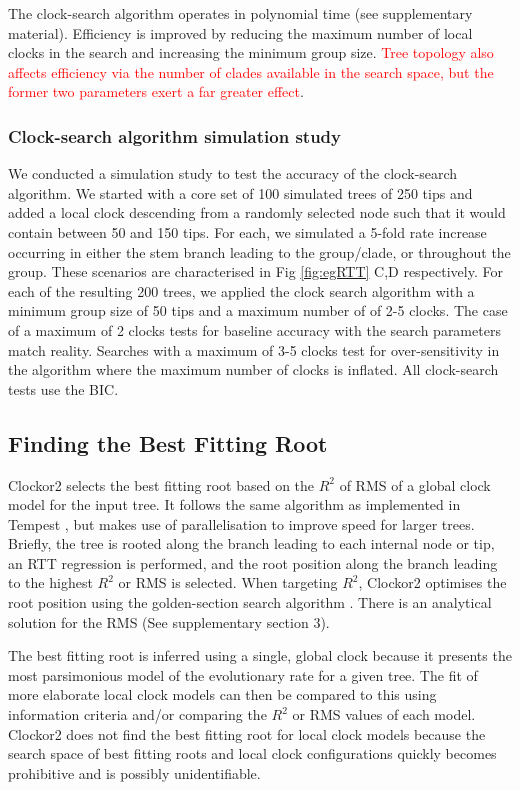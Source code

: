 \documentclass{article}
\begin{document}
The clock-search algorithm operates in polynomial time (see supplementary material). Efficiency is improved by reducing the maximum number of local clocks in the search and increasing the minimum group size. \textcolor{red}{Tree topology also affects efficiency via the number of clades available in the search space, but the former two parameters exert a far greater effect}.

\subsubsection*{Clock-search algorithm simulation study}
We conducted a simulation study to test the accuracy of the clock-search algorithm. We started with a core set of 100 simulated trees of 250 tips and added a local clock descending from a randomly selected node such that it would contain between 50 and 150 tips. For each, we simulated a 5-fold rate increase occurring in either the stem branch leading to the group/clade, or throughout the group. These scenarios are characterised in  Fig \ref{fig:egRTT} C,D respectively. For each of the resulting 200 trees, we applied the clock search algorithm with a minimum group size of 50 tips and a maximum number of of 2-5 clocks. The case of a maximum of 2 clocks tests for baseline accuracy with the search parameters match reality. Searches with a maximum of 3-5 clocks test for over-sensitivity in the algorithm where the maximum number of clocks is inflated. All clock-search tests use the BIC.

\subsection*{Finding the Best Fitting Root}
Clockor2 selects the best fitting root based on the $R^2$ of RMS of a global clock model for the input tree. It follows the same algorithm as implemented in Tempest \citep{rambaut_exploring_2016}, but makes use of parallelisation to improve speed for larger trees. Briefly, the tree is rooted along the branch leading to each internal node or tip, an RTT regression is performed, and the root position along the branch leading to the highest $R^2$ or RMS is selected. When targeting $R^2$, Clockor2 optimises the root position using the golden-section search algorithm \citep{kiefer_sequential}. There is an analytical solution for the RMS (See supplementary section 3).

The best fitting root is inferred using a single, global clock because it presents the most parsimonious model of the evolutionary rate for a given tree. The fit of more elaborate local clock models can then be compared to this using information criteria and/or comparing the $R^2$ or RMS
values of each model. Clockor2 does not find the best fitting root for local clock models because the search space of best fitting roots and local clock configurations quickly becomes prohibitive and is possibly unidentifiable.
\end{document}
